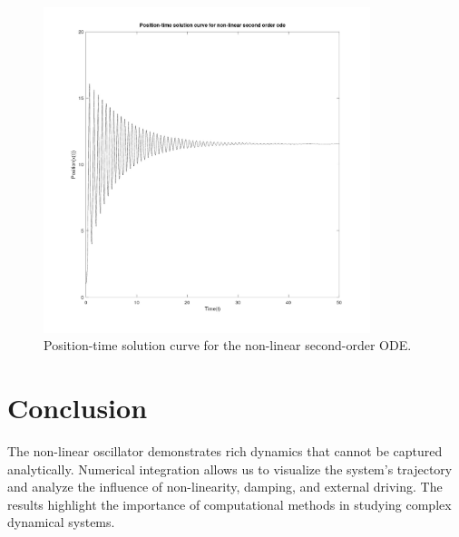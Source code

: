\begin{figure}[h!]
    \centering
    \includegraphics[width=0.85\textwidth]{a4.jpg}
    \caption{Position-time solution curve for the non-linear second-order ODE.}
\end{figure}

\section*{Conclusion}
The non-linear oscillator demonstrates rich dynamics that cannot be captured analytically. Numerical integration allows us to visualize the system's trajectory and analyze the influence of non-linearity, damping, and external driving. The results highlight the importance of computational methods in studying complex dynamical systems.
